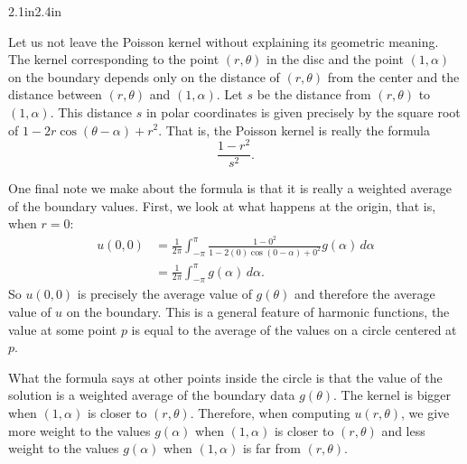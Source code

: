 \begin{mywrapfigsimp}[11]{2.1in}{2.4in}
\diffypdfversion{\vspace*{5pt}}
\noindent
{}
\end{mywrapfigsimp}
Let us not leave the Poisson kernel without explaining its geometric
meaning.
The kernel corresponding to the point $(r,\theta)$ in the disc
and the point $(1,\alpha)$ on the boundary depends only
on the distance of $(r,\theta)$ from the center and
the distance between $(r,\theta)$ and $(1,\alpha)$.
Let $s$ be the distance from $(r,\theta)$ to
$(1,\alpha)$.
This distance $s$ in polar coordinates is given precisely by the square root
of $1 - 2r\cos(\theta-\alpha) +r^2$.  That is, the Poisson kernel is really
the formula
\begin{equation*}
\frac{1-r^2}{s^2} .
\end{equation*}

One final note we make about the formula is that it is really
a weighted average of the boundary values.
First, we look
at what happens at the origin,
that is, when $r=0$: %
\begin{equation*}
\begin{split}
u(0,0) &= 
\frac{1}{2\pi} \int_{-\pi}^{\pi}
\frac{1 -0^2}{1 - 2(0)\cos(0-\alpha) +0^2} g(\alpha) \, d\alpha
\\
& =
\frac{1}{2\pi} \int_{-\pi}^{\pi}
g(\alpha) \, d\alpha .
\end{split}
\end{equation*}
So $u(0,0)$ is precisely the average value of $g(\theta)$ and
therefore the average value of $u$ on the boundary.  This is
a general feature of harmonic functions, the value at some point $p$
is equal to the average of the values on a circle centered at $p$.

What the formula says at other points inside the circle
is that the value of the solution
is a weighted average of the boundary data $g(\theta)$.  The kernel
is bigger when $(1,\alpha)$ is closer to $(r,\theta)$.  Therefore, when
computing $u(r,\theta)$, we
give more weight to the values $g(\alpha)$ when $(1,\alpha)$ is closer to $(r,\theta)$ and less
weight to the values $g(\alpha)$ when $(1,\alpha)$ is far from $(r,\theta)$.

